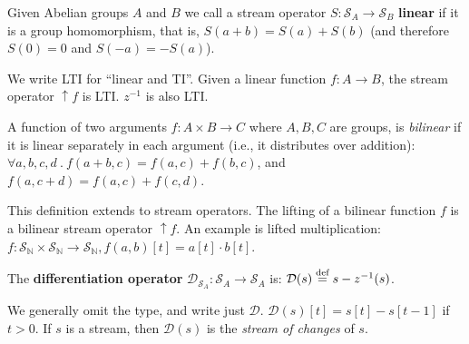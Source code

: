 \documentclass[twocolumn
]{svjour3}
\numberwithin{equation}{section}
\newcommand{\defined}[1]{\textbf{#1}\index{}}
\newcommand{\N}{\mathbb{N}}  %
\newcommand{\stream}[1]{\ensuremath{\mathcal{S}_{#1}}}
\newcommand{\zm}{\ensuremath{z^{-1}}} %
\newcommand{\D}{\mathcal{D}}  %
\newcommand{\D}{\mathit{D}}  %
\newcommand{\defn}{\stackrel{\textrm{\scriptsize def}}{=}}
\newcommand{\lift}[1]{{\uparrow}#1}
\begin{document}
\begin{definition}[linear]
Given Abelian groups $A$ and $B$ we call a stream operator
$S: \stream{A} \rightarrow \stream{B}$ \defined{linear} if it is a group homomorphism, that is,
$S(a+b)=S(a)+S(b)$ (and therefore $S(0)=0$ and $S(-a)=-S(a)$).
\end{definition}

We write LTI for ``linear and TI''.  Given a linear function $f: A \to
B$, the stream operator $\lift{f}$ is LTI.  $\zm$ is also LTI.

\begin{definition}[bilinear]
A function of two arguments $f: A \times B \to C$ where $A, B, C$ are
groups, is \emph{bilinear} if it is linear separately in each argument
(i.e., it distributes over addition): $\forall a, b, c, d~.~f(a+b, c)
= f(a, c) + f(b, c)$, and $f(a, c+d) = f(a, c) + f(c, d).$
\end{definition}

This definition extends to stream operators.
The lifting of a bilinear function $f$ is
a bilinear stream operator $\lift{f}$.  An example
is lifted multiplication:
$f: \stream{\N} \times \stream{\N} \to \stream{\N}, f(a, b)[t] = a[t]\cdot b[t]$.


\begin{definition}[differentiation]
The \defined{differentiation operator} $\D_{\stream{A}} : \stream{A}
\to \stream{A}$ is: $\D(s) \defn s - \zm(s)$.
\begin{center}
\end{center}
\end{definition}
We generally omit the type, and write just $\D$.  $\D(s)[t] = s[t] -
s[t-1]$ if $t > 0$.  If $s$ is a stream, then $\D(s)$ is the
\emph{stream of changes} of $s$.
\end{document}

